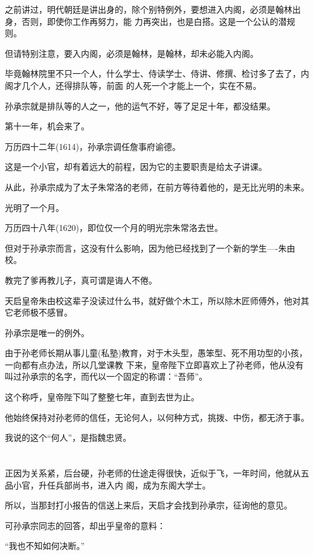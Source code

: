 \documentclass[11pt,a4paper,onecolumn]{article}
\begin{document}
之前讲过，明代朝廷是讲出身的，除个别特例外，要想进入内阁，必须是翰林出身，否则，即使你工作再努力，能
力再突出，也是白搭。这是一个公认的潜规则。

但请特别注意，要入内阁，必须是翰林，是翰林，却未必能入内阁。

毕竟翰林院里不只一个人，什么学士、侍读学士、侍讲、修撰、检讨多了去了，内阁才几个人，还得排队等，前面
的人死一个才能上一个，实在不易。

孙承宗就是排队等的人之一，他的运气不好，等了足足十年，都没结果。

第十一年，机会来了。

万历四十二年(1614)，孙承宗调任詹事府谕德。

这是一个小官，却有着远大的前程，因为它的主要职责是给太子讲课。

从此，孙承宗成为了太子朱常洛的老师，在前方等待着他的，是无比光明的未来。

光明了一个月。

万历四十八年(1620)，即位仅一个月的明光宗朱常洛去世。

但对于孙承宗而言，这没有什么影响，因为他已经找到了一个新的学生----朱由校。

教完了爹再教儿子，真可谓是诲人不倦。

天启皇帝朱由校这辈子没读过什么书，就好做个木工，所以除木匠师傅外，他对其它老师极不感冒。

孙承宗是唯一的例外。

由于孙老师长期从事儿童(私塾)教育，对于木头型，愚笨型、死不用功型的小孩，一向都有点办法，所以几堂课教
下来，皇帝陛下立即喜欢上了孙老师，他从没有叫过孙承宗的名字，而代以一个固定的称谓：``吾师''。

这个称呼，皇帝陛下叫了整整七年，直到去世为止。

他始终保持对孙老师的信任，无论何人，以何种方式，挑拨、中伤，都无济于事。

我说的这个``何人''，是指魏忠贤。

\section[\thesection]{}

正因为关系紧，后台硬，孙老师的仕途走得很快，近似于飞，一年时间，他就从五品小官，升任兵部尚书，进入内
阁，成为东阁大学士。

所以，当那封打小报告的信送上来后，天启才会找到孙承宗，征询他的意见。

可孙承宗同志的回答，却出乎皇帝的意料：

``我也不知如何决断。''
\end{document}
